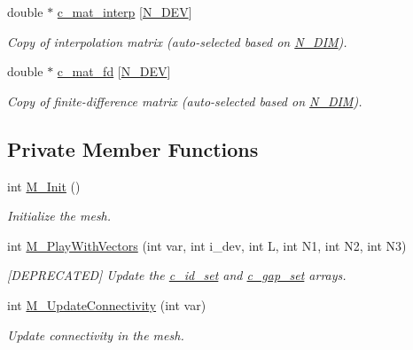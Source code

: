 \begin{DoxyCompactItemize}
double $\ast$ \hyperlink{classMesh_a62654a23312cea092be756fb57a3773c}{c\+\_\+mat\+\_\+interp} \mbox{[}\hyperlink{cppspec_8h_a2b674dab7a14f1bf32b48b7fda5022dc}{N\+\_\+\+D\+EV}\mbox{]}
\begin{DoxyCompactList}\small\item\em Copy of interpolation matrix (auto-\/selected based on \hyperlink{cppspec_8h_a327d0faa306d7663502be8df312a815e}{N\+\_\+\+D\+IM}). \end{DoxyCompactList}\item 
double $\ast$ \hyperlink{classMesh_a7e945bb93aa52a3fc98cf42ba8563830}{c\+\_\+mat\+\_\+fd} \mbox{[}\hyperlink{cppspec_8h_a2b674dab7a14f1bf32b48b7fda5022dc}{N\+\_\+\+D\+EV}\mbox{]}
\begin{DoxyCompactList}\small\item\em Copy of finite-\/difference matrix (auto-\/selected based on \hyperlink{cppspec_8h_a327d0faa306d7663502be8df312a815e}{N\+\_\+\+D\+IM}). \end{DoxyCompactList}\end{DoxyCompactItemize}
\subsection*{Private Member Functions}
\begin{DoxyCompactItemize}
\item 
int \hyperlink{classMesh_a2260b774a142e91c4712bd92774ca258}{M\+\_\+\+Init} ()
\begin{DoxyCompactList}\small\item\em Initialize the mesh. \end{DoxyCompactList}\item 
int \hyperlink{classMesh_a30debb82da28f6964969edc1f33c4759}{M\+\_\+\+Play\+With\+Vectors} (int var, int i\+\_\+dev, int L, int N1, int N2, int N3)
\begin{DoxyCompactList}\small\item\em \mbox{[}D\+E\+P\+R\+E\+C\+A\+T\+ED\mbox{]} Update the \hyperlink{classMesh_ae4bc3c2c0013415db58fa77623b21ca5}{c\+\_\+id\+\_\+set} and \hyperlink{classMesh_a34f413b39ee5010f0bd8ddb271c25064}{c\+\_\+gap\+\_\+set} arrays. \end{DoxyCompactList}\item 
int \hyperlink{classMesh_af4d2218c68524d3c6eaa2065be392cb1}{M\+\_\+\+Update\+Connectivity} (int var)
\begin{DoxyCompactList}\small\item\em Update connectivity in the mesh. \end{DoxyCompactList}\end{DoxyCompactItemize}
